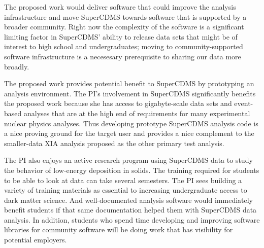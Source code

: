 The proposed work would deliver software that could improve the analysis infrastructure and move SuperCDMS towards software that is supported by a broader community.  Right now the complexity of the software is a significant limiting factor in SuperCDMS' ability to release data sets that might be of interest to high school and undergraduates; moving to community-supported software infrastructure is a necesesary prerequisite to sharing our data more broadly.

The proposed work provides potential benefit to SuperCDMS by prototyping an analysis environment.  The PI's involvement in SuperCDMS significantly benefits the proposed work because she has access to gigabyte-scale data sets and event-based analyses that are at the high end of requirements for many experimental nuclear physics analyses.  Thus developing prototype SuperCDMS analysis code is a nice proving ground for the target user and provides a nice complement to the smaller-data XIA analysis proposed as the other primary test analysis.

The PI also enjoys an active research program using SuperCDMS data to study the behavior of low-energy deposition in solids.  The training required for students to be able to look at data can take several semesters.  The PI sees building a variety of training materials as essential to increasing undergraduate access to dark matter science.  And well-documented analysis software would immediately benefit students if that same documentation helped them with SuperCDMS data analysis.  In addition, students who spend time developing and improving software libraries for community software will be doing work that has visibility for potential employers.


 
